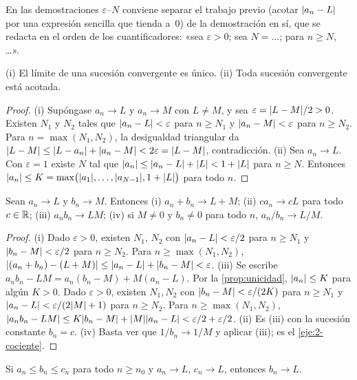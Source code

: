 En las demostraciones $\varepsilon$--$N$ conviene separar el trabajo previo (acotar $\lvert a_n-L\rvert$ por una expresión sencilla que tienda a~0) de la demostración en sí, que se redacta en el orden de los cuantificadores: «sea $\varepsilon>0$; sea $N=\dots$; para $n\ge N$, \dots».

\begin{proposicion}\label{prop:unicidad}
(i) El límite de una sucesión convergente es único. (ii) Toda sucesión convergente está acotada.
\end{proposicion}

\begin{proof}
(i) Supóngase $a_n\to L$ y $a_n\to M$ con $L\ne M$, y sea $\varepsilon=\lvert L-M\rvert/2>0$. Existen $N_1$ y $N_2$ tales que $\lvert a_n-L\rvert<\varepsilon$ para $n\ge N_1$ y $\lvert a_n-M\rvert<\varepsilon$ para $n\ge N_2$. Para $n=\max(N_1,N_2)$, la desigualdad triangular da $\lvert L-M\rvert\le\lvert L-a_n\rvert+\lvert a_n-M\rvert<2\varepsilon=\lvert L-M\rvert$, contradicción.
(ii) Sea $a_n\to L$. Con $\varepsilon=1$ existe $N$ tal que $\lvert a_n\rvert\le\lvert a_n-L\rvert+\lvert L\rvert<1+\lvert L\rvert$ para $n\ge N$. Entonces $\lvert a_n\rvert\le K=\max\bigl(\lvert a_1\rvert,\dots,\lvert a_{N-1}\rvert,1+\lvert L\rvert\bigr)$ para todo $n$.
\end{proof}

\begin{teorema}\label{teo:algebra-sucesiones}
Sean $a_n\to L$ y $b_n\to M$. Entonces
(i) $a_n+b_n\to L+M$; (ii) $ca_n\to cL$ para todo $c\in\mathbb{R}$; (iii) $a_nb_n\to LM$; (iv) si $M\ne0$ y $b_n\ne0$ para todo $n$, $a_n/b_n\to L/M$.
\end{teorema}

\begin{proof}
(i) Dado $\varepsilon>0$, existen $N_1$, $N_2$ con $\lvert a_n-L\rvert<\varepsilon/2$ para $n\ge N_1$ y $\lvert b_n-M\rvert<\varepsilon/2$ para $n\ge N_2$. Para $n\ge\max(N_1,N_2)$, $\lvert(a_n+b_n)-(L+M)\rvert\le\lvert a_n-L\rvert+\lvert b_n-M\rvert<\varepsilon$.
(iii) Se escribe $a_nb_n-LM=a_n(b_n-M)+M(a_n-L)$. Por la \cref{prop:unicidad}, $\lvert a_n\rvert\le K$ para algún $K>0$. Dado $\varepsilon>0$, existen $N_1,N_2$ con $\lvert b_n-M\rvert<\varepsilon/(2K)$ para $n\ge N_1$ y $\lvert a_n-L\rvert<\varepsilon/(2\lvert M\rvert+1)$ para $n\ge N_2$. Para $n\ge\max(N_1,N_2)$, $\lvert a_nb_n-LM\rvert\le K\lvert b_n-M\rvert+\lvert M\rvert\lvert a_n-L\rvert<\varepsilon/2+\varepsilon/2$.
(ii) Es (iii) con la sucesión constante $b_n=c$. (iv) Basta ver que $1/b_n\to1/M$ y aplicar (iii); es el \cref{eje:2-cociente}.
\end{proof}

\begin{teorema}\label{teo:sandwich}
Si $a_n\le b_n\le c_n$ para todo $n\ge n_0$ y $a_n\to L$, $c_n\to L$, entonces $b_n\to L$.
\end{teorema}

